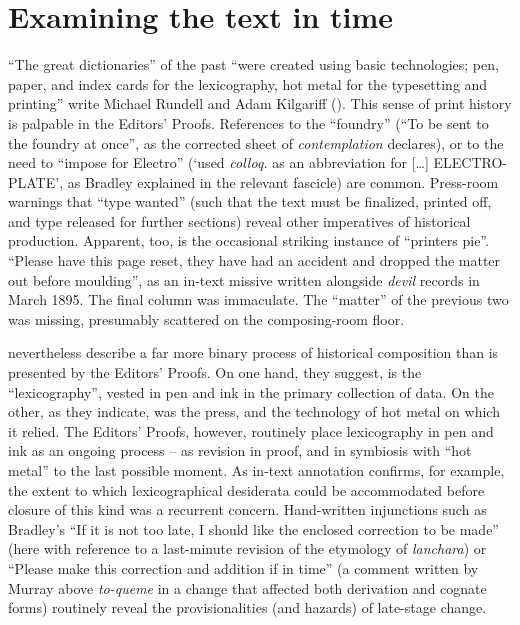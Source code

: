 \documentclass[output=paper,colorlinks,citecolor=brown,arabicfont,chinesefont]{langscibook}
\begin{document}
\section{Examining the text in time}

“The great dictionaries” of the past “were created using basic technologies; pen, paper, and index cards for the lexicography, hot metal for the typesetting and printing” write Michael Rundell and Adam Kilgariff (\citealt[258]{Rundell2011}). This sense of print history is palpable in the Editors’ Proofs. References to the “foundry” (“To be sent to the foundry at once”, as the corrected sheet of \emph{contemplation} declares), or to the need to “impose for Electro” (`used \emph{colloq.} as an abbreviation for […] ELECTRO-PLATE’, as Bradley explained in the relevant fascicle) are common. Press-room warnings that “type wanted” (such that the text must be finalized, printed off, and type released for further sections) reveal other imperatives of historical production. Apparent, too, is the occasional striking instance of “printers pie”. “Please have this page reset, they have had an accident and dropped the matter out before moulding”, as an in-text missive written alongside \emph{devil} records in March 1895. The final column was immaculate. The “matter” of the previous two was missing, presumably scattered on the composing-room floor.

\citet{Rundell2011} nevertheless describe a far more binary process of historical composition than is presented by the Editors’ Proofs. On one hand, they suggest, is the “lexicography”, vested in pen and ink in the primary collection of data. On the other, as they indicate, was the press, and the technology of hot metal on which it relied. The Editors’ Proofs, however, routinely place lexicography in pen and ink as an ongoing process – as revision in proof, and in symbiosis with “hot metal” to the last possible moment. As in-text annotation confirms, for example, the extent to which lexicographical desiderata could be accommodated before closure of this kind was a recurrent concern. Hand-written injunctions such as Bradley’s “If it is not too late, I should like the enclosed correction to be made” (here with reference to a last-minute revision of the etymology of \emph{lanchara}) or “Please make this correction and addition if in time” (a comment written by Murray above \emph{to-queme} in a change that affected both derivation and cognate forms) routinely reveal the provisionalities (and hazards) of late-stage change. 
\end{document}
